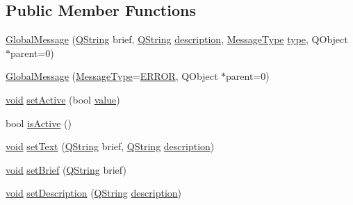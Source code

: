 \subsection*{Public Member Functions}
\begin{DoxyCompactItemize}
\item 
\hyperlink{group___core_plugin_ga4221065546e0e2ac93ead9ecc246c70f}{Global\-Message} (\hyperlink{group___u_a_v_objects_plugin_gab9d252f49c333c94a72f97ce3105a32d}{Q\-String} brief, \hyperlink{group___u_a_v_objects_plugin_gab9d252f49c333c94a72f97ce3105a32d}{Q\-String} \hyperlink{sdlgamepad_8dox_ae82208d022e4246ddf1e4f481a3f81b0}{description}, \hyperlink{group___core_plugin_ga51bd6651e9cc7b45aeaff9bd5991be3d}{Message\-Type} \hyperlink{glext_8h_a7d05960f4f1c1b11f3177dc963a45d86}{type}, Q\-Object $\ast$parent=0)
\item 
\hyperlink{group___core_plugin_ga695a4804697eca5a8ed43aa5de802b4d}{Global\-Message} (\hyperlink{group___core_plugin_ga51bd6651e9cc7b45aeaff9bd5991be3d}{Message\-Type}=\hyperlink{group___core_plugin_gga51bd6651e9cc7b45aeaff9bd5991be3da1b81696793f3033d6741d6b8a59ac60a}{E\-R\-R\-O\-R}, Q\-Object $\ast$parent=0)
\item 
\hyperlink{group___u_a_v_objects_plugin_ga444cf2ff3f0ecbe028adce838d373f5c}{void} \hyperlink{group___core_plugin_gaab47836803fae367ea72f40320089d28}{set\-Active} (bool \hyperlink{glext_8h_aa0e2e9cea7f208d28acda0480144beb0}{value})
\item 
bool \hyperlink{group___core_plugin_ga05b5cb5bd16c393a06028e18827e1869}{is\-Active} ()
\item 
\hyperlink{group___u_a_v_objects_plugin_ga444cf2ff3f0ecbe028adce838d373f5c}{void} \hyperlink{group___core_plugin_gaf3383d5bfaeb02ba674ed8d30b1fa762}{set\-Text} (\hyperlink{group___u_a_v_objects_plugin_gab9d252f49c333c94a72f97ce3105a32d}{Q\-String} brief, \hyperlink{group___u_a_v_objects_plugin_gab9d252f49c333c94a72f97ce3105a32d}{Q\-String} \hyperlink{sdlgamepad_8dox_ae82208d022e4246ddf1e4f481a3f81b0}{description})
\item 
\hyperlink{group___u_a_v_objects_plugin_ga444cf2ff3f0ecbe028adce838d373f5c}{void} \hyperlink{group___core_plugin_ga3e32cefcff3e4b72543ecafccc106f0b}{set\-Brief} (\hyperlink{group___u_a_v_objects_plugin_gab9d252f49c333c94a72f97ce3105a32d}{Q\-String} brief)
\item 
\hyperlink{group___u_a_v_objects_plugin_ga444cf2ff3f0ecbe028adce838d373f5c}{void} \hyperlink{group___core_plugin_gaf3d82a250c85cf4fc446962fd4755f9b}{set\-Description} (\hyperlink{group___u_a_v_objects_plugin_gab9d252f49c333c94a72f97ce3105a32d}{Q\-String} \hyperlink{sdlgamepad_8dox_ae82208d022e4246ddf1e4f481a3f81b0}{description})

\end{DoxyCompactItemize}
